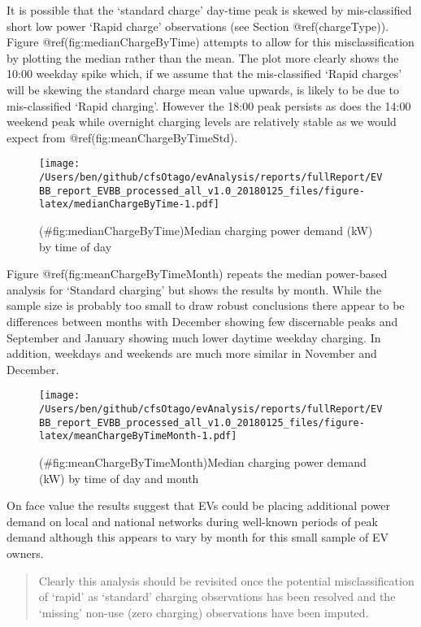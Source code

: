 \documentclass[]{article}
\begin{document}
It is possible that the `standard charge' day-time peak is skewed by mis-classified short low power `Rapid charge' observations (see Section @ref(chargeType)). Figure @ref(fig:medianChargeByTime) attempts to allow for this misclassification by plotting the median rather than the mean. The plot more clearly shows the 10:00 weekday spike which, if we assume that the mis-classified `Rapid charges' will be skewing the standard charge mean value upwards, is likely to be due to mis-classified `Rapid charging'. However the 18:00 peak persists as does the 14:00 weekend peak while overnight charging levels are relatively stable as we would expect from @ref(fig:meanChargeByTimeStd).

\begin{figure}
\centering
\texttt{[image: /Users/ben/github/cfsOtago/evAnalysis/reports/fullReport/EVBB\_report\_EVBB\_processed\_all\_v1.0\_20180125\_files/figure-latex/medianChargeByTime-1.pdf]}
\caption{(\#fig:medianChargeByTime)Median charging power demand (kW) by time of day}
\end{figure}

Figure @ref(fig:meanChargeByTimeMonth) repeats the median power-based analysis for `Standard charging' but shows the results by month. While the sample size is probably too small to draw robust conclusions there appear to be differences between months with December showing few discernable peaks and September and January showing much lower daytime weekday charging. In addition, weekdays and weekends are much more similar in November and December.

\begin{figure}
\centering
\texttt{[image: /Users/ben/github/cfsOtago/evAnalysis/reports/fullReport/EVBB\_report\_EVBB\_processed\_all\_v1.0\_20180125\_files/figure-latex/meanChargeByTimeMonth-1.pdf]}
\caption{(\#fig:meanChargeByTimeMonth)Median charging power demand (kW) by time of day and month}
\end{figure}

On face value the results suggest that EVs could be placing additional power demand on local and national networks during well-known periods of peak demand although this appears to vary by month for this small sample of EV owners.

\begin{quote}
Clearly this analysis should be revisited once the potential misclassification of `rapid' as `standard' charging observations has been resolved and the `missing' non-use (zero charging) observations have been imputed.
\end{quote}
\end{document}
